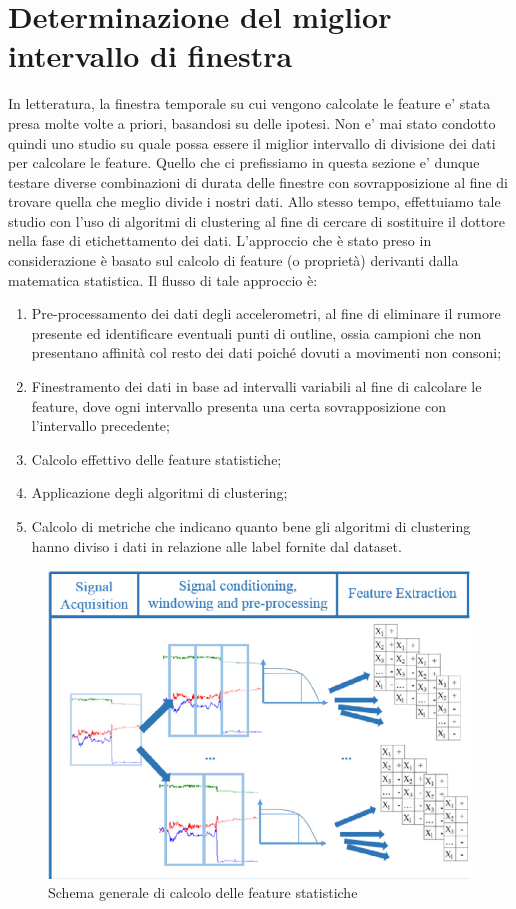 \section{Determinazione del miglior intervallo di finestra}
In letteratura, la finestra temporale su cui vengono calcolate le feature e' stata presa molte volte a priori, basandosi su delle ipotesi. Non e' mai stato condotto quindi uno studio su quale possa essere il miglior intervallo di divisione dei dati per calcolare le feature. Quello che ci prefissiamo in questa sezione e' dunque testare diverse combinazioni di durata delle finestre con sovrapposizione al fine di trovare quella che meglio divide i nostri dati. Allo stesso tempo, effettuiamo tale studio con l'uso di algoritmi di clustering al fine di cercare di sostituire il dottore nella fase di etichettamento dei dati.  L'approccio che è stato preso in considerazione è basato sul calcolo di feature (o proprietà) derivanti dalla matematica statistica. Il flusso di tale approccio è:
\begin{enumerate}
	\item Pre-processamento dei dati degli accelerometri, al fine di eliminare il rumore presente ed identificare eventuali punti di outline, ossia campioni che non presentano affinità col resto dei dati poiché dovuti a movimenti non consoni;
	\item Finestramento dei dati in base ad intervalli variabili al fine di calcolare le feature, dove ogni intervallo presenta una certa sovrapposizione con l'intervallo precedente;
	\item Calcolo effettivo delle feature statistiche;
	\item Applicazione degli algoritmi di clustering;
	\item Calcolo di metriche che indicano quanto bene gli algoritmi di clustering hanno diviso i dati in relazione alle label fornite dal dataset.
\end{enumerate}
\begin{figure}[h!]
	\centering
	\includegraphics[scale=0.6]{images/flusso_feature.png}
	\caption{Schema generale di calcolo delle feature statistiche}
	\label{Flusso Feature}
\end{figure}
